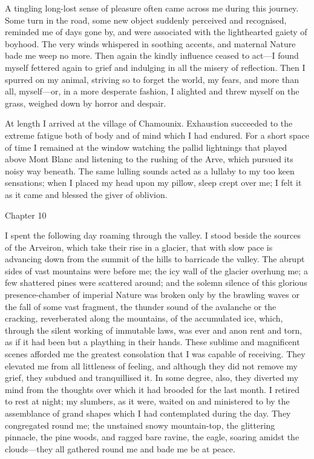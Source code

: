 \documentclass[12pt,openright]{book}
\begin{document}
A tingling long-lost sense of pleasure often came across me during this journey. Some turn in the road, some new object suddenly perceived and recognised, reminded me of days gone by, and were associated with the lighthearted gaiety of boyhood. The very winds whispered in soothing accents, and maternal Nature bade me weep no more. Then again the kindly influence ceased to act—I found myself fettered again to grief and indulging in all the misery of reflection. Then I spurred on my animal, striving so to forget the world, my fears, and more than all, myself—or, in a more desperate fashion, I alighted and threw myself on the grass, weighed down by horror and despair.

At length I arrived at the village of Chamounix. Exhaustion succeeded to the extreme fatigue both of body and of mind which I had endured. For a short space of time I remained at the window watching the pallid lightnings that played above Mont Blanc and listening to the rushing of the Arve, which pursued its noisy way beneath. The same lulling sounds acted as a lullaby to my too keen sensations; when I placed my head upon my pillow, sleep crept over me; I felt it as it came and blessed the giver of oblivion.

Chapter 10

I spent the following day roaming through the valley. I stood beside the sources of the Arveiron, which take their rise in a glacier, that with slow pace is advancing down from the summit of the hills to barricade the valley. The abrupt sides of vast mountains were before me; the icy wall of the glacier overhung me; a few shattered pines were scattered around; and the solemn silence of this glorious presence-chamber of imperial Nature was broken only by the brawling waves or the fall of some vast fragment, the thunder sound of the avalanche or the cracking, reverberated along the mountains, of the accumulated ice, which, through the silent working of immutable laws, was ever and anon rent and torn, as if it had been but a plaything in their hands. These sublime and magnificent scenes afforded me the greatest consolation that I was capable of receiving. They elevated me from all littleness of feeling, and although they did not remove my grief, they subdued and tranquillised it. In some degree, also, they diverted my mind from the thoughts over which it had brooded for the last month. I retired to rest at night; my slumbers, as it were, waited on and ministered to by the assemblance of grand shapes which I had contemplated during the day. They congregated round me; the unstained snowy mountain-top, the glittering pinnacle, the pine woods, and ragged bare ravine, the eagle, soaring amidst the clouds—they all gathered round me and bade me be at peace.
\end{document}
